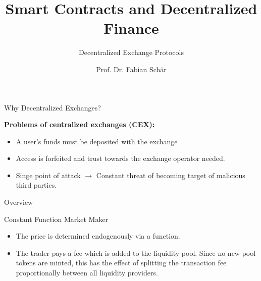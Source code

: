 \documentclass[]{beamer}
\title{Smart Contracts and Decentralized Finance}
\subtitle{Decentralized Exchange Protocols}
\author{Prof. Dr. Fabian Schär}
\institute{University of Basel}
\begin{document}
\thispagestyle{empty}
\begin{frame}[noframenumbering]
	\titlepage
\end{frame}


\begin{frame}{Why Decentralized Exchanges?}

	\textbf{Problems of centralized exchanges (CEX):}
		\begin{small}
		\begin{itemize}
			\item A user's funds must be deposited with the exchange
			\item Access is forfeited and trust towards the exchange operator needed.
			\item Singe point of attack $\rightarrow$ Constant threat of becoming target of malicious third parties.
		\end{itemize}
		\end{small}	

\vspace{1.5em}

\end{frame}

\begin{frame}{Overview}
	\begin{figure}[h!]
		
	\end{figure}
\end{frame}	


\begin{frame}{Constant Function Market Maker}

	\begin{figure}	
		\centering
		
	\end{figure}

	\begin{itemize}
		\item<5-> {The price is determined endogenously via a function.}
		\item<6-> The trader pays a fee which is added to the liquidity pool. Since no new pool tokens are minted, this has the effect of splitting the transaction fee proportionally between all liquidity providers. %
	\end{itemize}


\end{frame}
\end{document}
